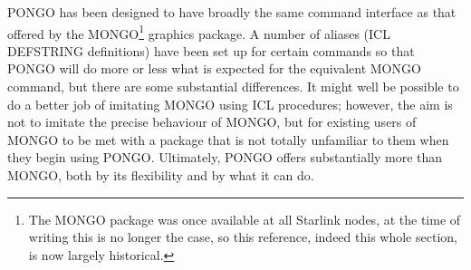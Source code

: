PONGO has been designed to have broadly the same command interface as
that offered by the MONGO\footnote{The MONGO package was once
available at all Starlink nodes, at the time of writing this is no
longer the case, so this reference, indeed this whole section, is now
largely historical.} graphics package.  A number of aliases (ICL
DEFSTRING definitions) have been set up for certain commands so that
PONGO will do more or less what is expected for the equivalent MONGO
command, but there are some substantial differences.  It might well be
possible to do a better job of imitating MONGO using ICL procedures;
however, the aim is not to imitate the precise behaviour of MONGO, but
for existing users of MONGO to be met with a package that is not
totally unfamiliar to them when they begin using PONGO.  Ultimately,
PONGO offers substantially more than MONGO, both by its flexibility
and by what it can do.

